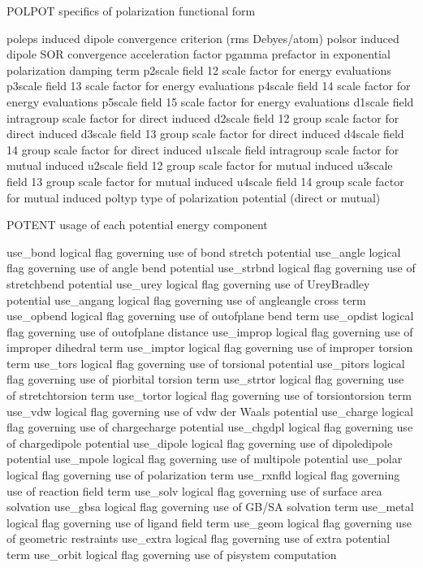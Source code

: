 \documentclass[letterpaper,11pt,english]{sphinxmanual}
\begin{document}
POLPOT  specifics of polarization functional form

poleps  induced dipole convergence criterion (rms Debyes/atom)
polsor  induced dipole SOR convergence acceleration factor
pgamma  prefactor in exponential polarization damping term
p2scale field 1\sphinxhyphen{}2 scale factor for energy evaluations
p3scale field 1\sphinxhyphen{}3 scale factor for energy evaluations
p4scale field 1\sphinxhyphen{}4 scale factor for energy evaluations
p5scale field 1\sphinxhyphen{}5 scale factor for energy evaluations
d1scale field intra\sphinxhyphen{}group scale factor for direct induced
d2scale field 1\sphinxhyphen{}2 group scale factor for direct induced
d3scale field 1\sphinxhyphen{}3 group scale factor for direct induced
d4scale field 1\sphinxhyphen{}4 group scale factor for direct induced
u1scale field intra\sphinxhyphen{}group scale factor for mutual induced
u2scale field 1\sphinxhyphen{}2 group scale factor for mutual induced
u3scale field 1\sphinxhyphen{}3 group scale factor for mutual induced
u4scale field 1\sphinxhyphen{}4 group scale factor for mutual induced
poltyp  type of polarization potential (direct or mutual)

POTENT  usage of each potential energy component

use\_bond        logical flag governing use of bond stretch potential
use\_angle       logical flag governing use of angle bend potential
use\_strbnd      logical flag governing use of stretch\sphinxhyphen{}bend potential
use\_urey        logical flag governing use of Urey\sphinxhyphen{}Bradley potential
use\_angang      logical flag governing use of angle\sphinxhyphen{}angle cross term
use\_opbend      logical flag governing use of out\sphinxhyphen{}of\sphinxhyphen{}plane bend term
use\_opdist      logical flag governing use of out\sphinxhyphen{}of\sphinxhyphen{}plane distance
use\_improp      logical flag governing use of improper dihedral term
use\_imptor      logical flag governing use of improper torsion term
use\_tors        logical flag governing use of torsional potential
use\_pitors      logical flag governing use of pi\sphinxhyphen{}orbital torsion term
use\_strtor      logical flag governing use of stretch\sphinxhyphen{}torsion term
use\_tortor      logical flag governing use of torsion\sphinxhyphen{}torsion term
use\_vdw logical flag governing use of vdw der Waals potential
use\_charge      logical flag governing use of charge\sphinxhyphen{}charge potential
use\_chgdpl      logical flag governing use of charge\sphinxhyphen{}dipole potential
use\_dipole      logical flag governing use of dipole\sphinxhyphen{}dipole potential
use\_mpole       logical flag governing use of multipole potential
use\_polar       logical flag governing use of polarization term
use\_rxnfld      logical flag governing use of reaction field term
use\_solv        logical flag governing use of surface area solvation
use\_gbsa        logical flag governing use of GB/SA solvation term
use\_metal       logical flag governing use of ligand field term
use\_geom        logical flag governing use of geometric restraints
use\_extra       logical flag governing use of extra potential term
use\_orbit       logical flag governing use of pisystem computation
\end{document}
